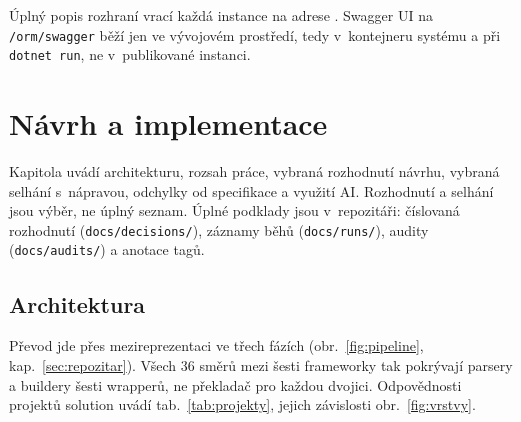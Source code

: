 Úplný popis rozhraní vrací každá instance na adrese . Swagger UI na \texttt{/orm/swagger} běží jen ve vývojovém prostředí, tedy v~kontejneru systému a při \texttt{dotnet run}, ne v~publikované instanci.

\section{Návrh a implementace}\label{sec:denik}

Kapitola uvádí architekturu, rozsah práce, vybraná rozhodnutí návrhu, vybraná selhání s~nápravou, odchylky od specifikace a využití AI. Rozhodnutí a selhání jsou výběr, ne úplný seznam. Úplné podklady jsou v~repozitáři: číslovaná rozhodnutí (\texttt{docs/decisions/}), záznamy běhů (\texttt{docs/runs/}), audity (\texttt{docs/audits/}) a anotace tagů.

\subsection{Architektura}\label{sec:architektura}

Převod jde přes mezireprezentaci ve třech fázích (obr.~\ref{fig:pipeline}, kap.~\ref{sec:repozitar}). Všech 36 směrů mezi šesti frameworky tak pokrývají parsery a buildery šesti wrapperů, ne překladač pro každou dvojici. Odpovědnosti projektů solution uvádí tab.~\ref{tab:projekty}, jejich závislosti obr.~\ref{fig:vrstvy}.

